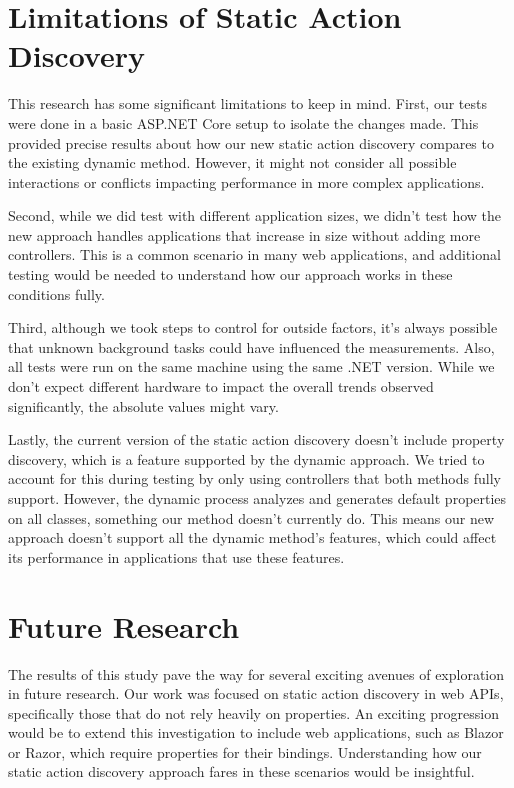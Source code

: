 \section{Limitations of Static Action Discovery}

This research has some significant limitations to keep in mind. First, our tests were done in a basic ASP.NET Core setup to isolate the changes made. This provided precise results about how our new static action discovery compares to the existing dynamic method. However, it might not consider all possible interactions or conflicts impacting performance in more complex applications.

Second, while we did test with different application sizes, we didn't test how the new approach handles applications that increase in size without adding more controllers. This is a common scenario in many web applications, and additional testing would be needed to understand how our approach works in these conditions fully.

Third, although we took steps to control for outside factors, it's always possible that unknown background tasks could have influenced the measurements. Also, all tests were run on the same machine using the same .NET version. While we don't expect different hardware to impact the overall trends observed significantly, the absolute values might vary.

Lastly, the current version of the static action discovery doesn't include property discovery, which is a feature supported by the dynamic approach. We tried to account for this during testing by only using controllers that both methods fully support. However, the dynamic process analyzes and generates default properties on all classes, something our method doesn't currently do. This means our new approach doesn't support all the dynamic method's features, which could affect its performance in applications that use these features.

\section{Future Research}

The results of this study pave the way for several exciting avenues of exploration in future research. Our work was focused on static action discovery in web APIs, specifically those that do not rely heavily on properties. An exciting progression would be to extend this investigation to include web applications, such as Blazor or Razor, which require properties for their bindings. Understanding how our static action discovery approach fares in these scenarios would be insightful.

